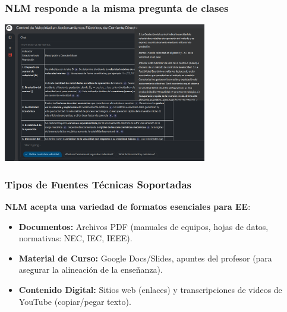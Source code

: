 \documentclass[aspectratio=43]{beamer}
\begin{document}
\begin{frame}
  \frametitle{NLM responde a la misma pregunta de clases}
  \begin{center}
    \includegraphics[width=3.5in]{indicadores.png}
  \end{center}
  \end{frame}

\begin{frame}
\frametitle{Tipos de Fuentes Técnicas Soportadas}

\textbf{NLM acepta una variedad de formatos esenciales para EE}:
\begin{itemize}
    \item \textbf{Documentos:} Archivos PDF (manuales de equipos, hojas de datos, normativas: NEC, IEC, IEEE).
    \item \textbf{Material de Curso:} Google Docs/Slides, apuntes del profesor (para asegurar la alineación de la enseñanza).
    \item \textbf{Contenido Digital:} Sitios web (enlaces) y transcripciones de videos de YouTube (copiar/pegar texto).
\end{itemize}
\end{frame}


\end{document}
